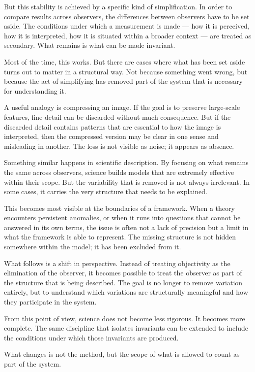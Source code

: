 \documentclass[11pt,openany]{book}
\begin{document}
But this stability is achieved by a specific kind of
simplification.  In order to compare results across
observers, the differences between observers have to be
set aside.  The conditions under which a measurement is
made — how it is perceived, how it is interpreted, how it
is situated within a broader context — are treated as
secondary.  What remains is what can be made invariant.

Most of the time, this works.  But there are cases where
what has been set aside turns out to matter in a structural
way.  Not because something went wrong, but because the act
of simplifying has removed part of the system that is
necessary for understanding it.

A useful analogy is compressing an image.  If the goal is
to preserve large-scale features, fine detail can be
discarded without much consequence.  But if the discarded
detail contains patterns that are essential to how the
image is interpreted, then the compressed version may be
clear in one sense and misleading in another.  The loss is
not visible as noise; it appears as absence.

Something similar happens in scientific description.  By
focusing on what remains the same across observers, science
builds models that are extremely effective within their
scope.  But the variability that is removed is not always
irrelevant.  In some cases, it carries the very structure
that needs to be explained.

This becomes most visible at the boundaries of a framework.
When a theory encounters persistent anomalies, or when it
runs into questions that cannot be answered in its own
terms, the issue is often not a lack of precision but a
limit in what the framework is able to represent.  The
missing structure is not hidden somewhere within the model;
it has been excluded from it.

What follows is a shift in perspective.  Instead of treating
objectivity as the elimination of the observer, it becomes
possible to treat the observer as part of the structure that
is being described.  The goal is no longer to remove
variation entirely, but to understand which variations are
structurally meaningful and how they participate in the
system.

From this point of view, science does not become less
rigorous.  It becomes more complete.  The same discipline
that isolates invariants can be extended to include the
conditions under which those invariants are produced.

What changes is not the method, but the scope of what is
allowed to count as part of the system.
\end{document}
